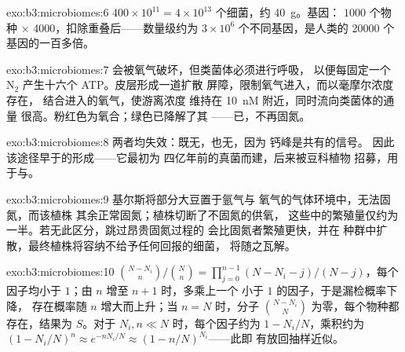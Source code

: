\begin{solution}{exo:b3:microbiomes:6}
$400\times 10^{11} = 4\times 10^{13}$ 个细菌，约 \qty{40}{g}。基因：
$1000$ 个物种 $\times$ \num{4000}，扣除重叠后——数量级约为
$3\times 10^{6}$ 个不同基因，是人类的
\num{20000} 个基因的一百多倍。
\end{solution}

\begin{solution}{exo:b3:microbiomes:7}
会被氧气破坏，但类菌体必须进行呼吸，
以便每固定一个 N$_{2}$ 产生十六个 ATP。皮层形成一道扩散
屏障，限制氧气进入，而以毫摩尔浓度存在，
结合进入的氧气，使游离浓度
维持在 \qty{10}{nM} 附近，同时流向类菌体的通量
很高。粉红色为氧合；绿色已降解了其
——已，不再固氮。
\end{solution}

\begin{solution}{exo:b3:microbiomes:8}
两者均失效：既无，也无，因为
钙峰是共有的信号。
因此该途径早于的形成——它最初为
四亿年前的真菌而建，后来被豆科植物
招募，用于与。
\end{solution}

\begin{solution}{exo:b3:microbiomes:9}
基尔斯将部分大豆置于氩气与
氧气的气体环境中，无法固氮，而该植株
其余正常固氮；植株切断了不固氮的供氧，
这些中的繁殖量仅约为
一半。若无此区分，跳过昂贵固氮过程的
会比固氮者繁殖更快，并在
种群中扩散，最终植株将容纳不给予任何回报的细菌，
将随之瓦解。
\end{solution}

\begin{solution}{exo:b3:microbiomes:10}
$\binom{N-N_{i}}{n}/\binom{N}{n} = \prod_{j=0}^{n-1}(N - N_{i} - j)/(N -
j)$，每个因子均小于 $1$；由 $n$ 增至 $n + 1$ 时，多乘上一个
小于 $1$ 的因子，于是漏检概率下降，
存在概率随 $n$ 增大而上升；当 $n = N$ 时，分子 $\binom{N -
N_{i}}{N}$ 为零，每个物种都存在，结果为 $S$。对于 $N_{i},
n \ll N$ 时，每个因子约为 $1 - N_{i}/N$，乘积约为 $(1 -
N_{i}/N)^{n} \approx e^{-nN_{i}/N} \approx (1 - n/N)^{N_{i}}$——此即
有放回抽样近似。
\end{solution}

